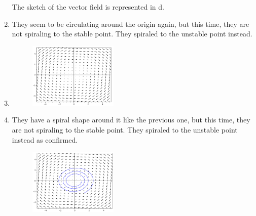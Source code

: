 \documentclass[12pt]{article}
\begin{document}
\begin{enumerate}[label=\alph*.]
    The sketch of the vector field is represented in d.
    \item They seem to be circulating around the origin again, but this time, they are not spiraling to the stable point. They spiraled to the unstable point instead.
    \item \begin{figure}[H]
        \centering
        \includegraphics[width=0.4\textwidth]{vectorField3.png} %
    \end{figure}
    \item They have a spiral shape around it like the previous one, but this time, they are not spiraling to the stable point. They spiraled to the unstable point instead as confirmed.
    \begin{figure}[H]
        \centering
        \includegraphics[width=0.4\textwidth]{vectorField4.png} %
    \end{figure}
\end{enumerate}
\end{document}
